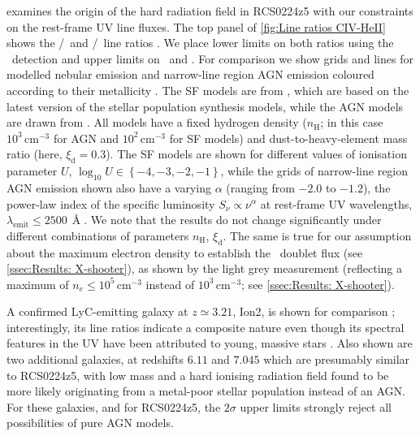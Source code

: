  examines the origin of the hard radiation field in RCS0224z5 with our constraints on the rest-frame UV line fluxes. The top panel of \cref{fig:Line ratios CIV-HeII} shows the \CIV/\CIII\ and \CIV/\HeII\ line ratios \citep[a SF vs. AGN diagnostic proposed by ][]{2016MNRAS.456.3354F}. We place lower limits on both ratios using the \CIV\ detection and upper limits on \CIII\ and \HeII. For comparison we show grids and lines for modelled nebular emission and narrow-line region AGN emission coloured according to their metallicity \citep[see legend; assuming a solar metallicity of $Z = 0.01524$,][]{2012MNRAS.427..127B}. The SF models are from \citet{2016MNRAS.462.1757G}, which are based on the latest version of the \citet{2003MNRAS.344.1000B} stellar population synthesis models, while the AGN models are drawn from \citet{2016MNRAS.456.3354F}. All models have a fixed hydrogen density ($n_\text{H}$; in this case $10^3 \, \mathrm{cm^{-3}}$ for AGN and $10^2 \, \mathrm{cm^{-3}}$ for SF models) and dust-to-heavy-element mass ratio (here, $\xi_\text{d}=0.3$). The SF models are shown for different values of ionisation parameter $U$, $\log_{10} U \in \left\{-4, -3, -2, -1 \right\}$, while the grids of narrow-line region AGN emission shown also have a varying $\alpha$ (ranging from $-2.0$ to $-1.2$), the power-law index of the specific luminosity $S_\nu \propto \nu^\alpha$ at rest-frame UV wavelengths, $\lambda_\text{emit} \leq 2500 \, \Angstrom$. We note that the results do not change significantly under different combinations of parameters $n_\text{H}$, $\xi_\text{d}$. The same is true for our assumption about the maximum electron density to establish the \CIII\ doublet flux (see \cref{ssec:Results: X-shooter}), as shown by the light grey measurement (reflecting a maximum of $n_e \leq 10^5 \, \mathrm{cm^{-3}}$ instead of $10^3 \, \mathrm{cm^{-3}}$; see \cref{ssec:Results: X-shooter}).

A confirmed LyC-emitting galaxy at $z \simeq 3.21$, Ion2, is shown for comparison \citep{2016A&A...585A..51D, 2016ApJ...825...41V, 2020MNRAS.491.1093V}; interestingly, its line ratios indicate a composite nature even though its spectral features in the UV have been attributed to young, massive stars \citep{2020MNRAS.491.1093V}. Also shown are two additional galaxies, at redshifts $6.11$ \citep{2015MNRAS.454.1393S} and $7.045$ \citep{2017ApJ...836L..14M} which are presumably similar to RCS0224z5, with low mass and a hard ionising radiation field found to be more likely originating from a metal-poor stellar population instead of an AGN. For these galaxies, and for RCS0224z5, the $2 \sigma$ upper limits strongly reject all possibilities of pure AGN models.

